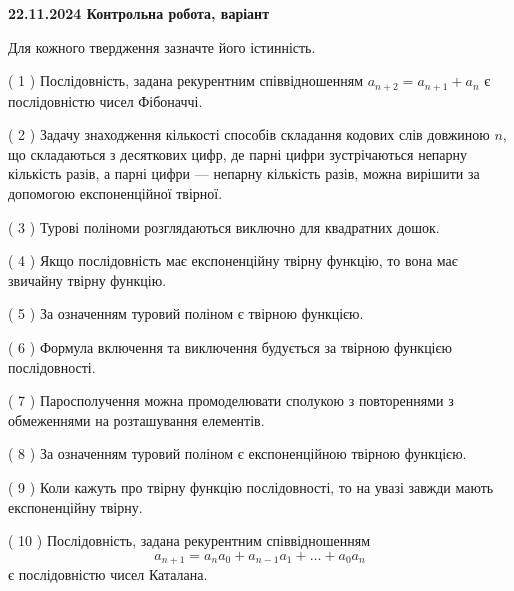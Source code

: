 \documentclass[12pt, ukrainian]{article}
\begin{document}
\vspace{4mm}
\newpage
\begin {large}

\textbf{22.11.2024 Контрольна робота, варіант  }\par


{
Для кожного твердження зазначте його істинність.\par
\vspace{2mm}
( 1 ) Послідовність, задана рекурентним співвідношенням $a_{n+2}=a_{n+1}+a_{n}$ є послідовністю чисел Фібоначчі.%

( 2 ) Задачу знаходження кількості способів складання кодових слів довжиною $n$, що складаються з десяткових цифр, де парні цифри зустрічаються непарну кількість разів, а парні цифри — непарну кількість разів, можна вирішити за допомогою експоненційної твірної.%

( 3 ) Турові поліноми розглядаються виключно для квадратних дошок.%

( 4 ) Якщо послідовність має експоненційну твірну функцію, то вона має звичайну твірну функцію.%

( 5 ) За означенням туровий поліном є твірною функцією.%

( 6 ) Формула включення та виключення будується за твірною функцією послідовності.%

( 7 ) Паросполучення можна промоделювати сполукою з повтореннями з обмеженнями на розташування елементів.%

( 8 ) За означенням туровий поліном є експоненційною твірною функцією.%

( 9 ) Коли кажуть про твірну функцію послідовності, то на увазі завжди мають експоненційну твірну.%

( 10 ) Послідовність, задана рекурентним співвідношенням $$a_{n+1}=a_{n}a_{0}+a_{n-1}a_{1}+\ldots+a_0a_{n}$$ є послідовністю чисел Каталана.%


\vspace{5mm}
}
\end {large}
\end{document}
